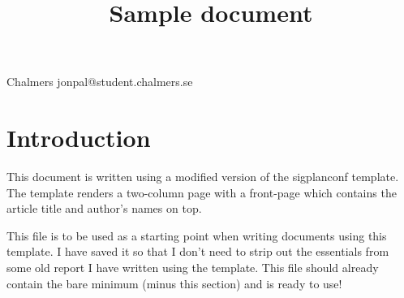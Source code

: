 \documentclass[]{sigplanconf}
\begin{document}
\title{Sample document}
\subtitle{}

           {Chalmers}
           {jonpal@student.chalmers.se}
\maketitle
\section{Introduction}
This document is written using a modified version of the sigplanconf template.
The template renders a two-column page with a front-page which contains the article title and author's names on top.

This file is to be used as a starting point when writing documents using this template. I have saved it so that I don't need to strip out the essentials from some old report I have written using the template. This file should already contain the bare minimum (minus this section) and is ready to use!
\end{document}
